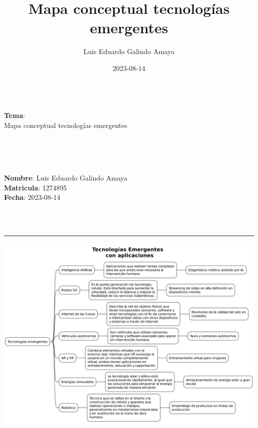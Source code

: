 \documentclass[11pt]{article}
\author{Luis Eduardo Galindo Amaya}
\date{2023-08-14}
\title{Mapa conceptual tecnologías emergentes}
\begin{document}
\newenvironment{onec}
               {
                 \begin{minipage}{0.18\textwidth}
                   \raggedright

                   \\
               }
               { 
                 \\\\
                 \end{minipage}
               }

\newenvironment{twoc}
               {
                 \begin{minipage}{0.39\textwidth}
                   \raggedright

                   \\
               }
               { 
                 \\\\
                 \end{minipage}
               }

\newenvironment{threec}
               {
                 \begin{minipage}{0.58\textwidth}
                   \raggedright

                   \\
               }
               { 
                 \\\\
                 \end{minipage}
               }

\begin{twoc}
\textbf{Tema}: \\
Mapa conceptual tecnologías emergentes
\end{twoc}
\begin{threec}
\textbf{Nombre}: Luis Eduardo Galindo Amaya \\
\textbf{Matricula}: 1274895 \\
\textbf{Fecha}: 2023-08-14 
\end{threec}


\noindent\rule{\textwidth}{0.5pt}
\vspace{\fill}
\begin{center}
\includegraphics[width=.9\linewidth]{images/a.png}
\end{center}
\vspace{\fill}
\end{document}
